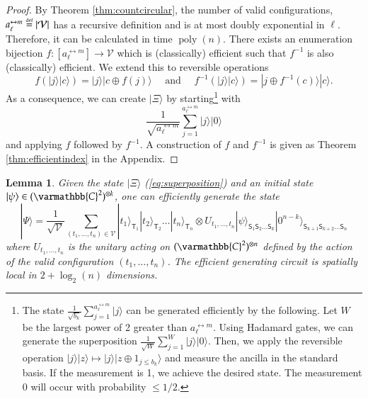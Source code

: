 \documentclass[11pt,letterpaper]{article}
\newtheorem{lemma}[theorem]{Lemma}
\theoremstyle{definition}
\theoremstyle{remark}
\let\mathbb\varmathbb
\newcommand{\abs}[1]{\lvert#1\rvert}
\newcommand{\defeq}{\stackrel{\mbox{\normalfont\tiny def}}=}
\DeclareMathOperator{\poly}{poly}
\newcommand{\cV}{\mathcal V}
\renewcommand{\leq}{\leqslant}
\numberwithin{equation}{section}
\theoremstyle{definition}
\newcommand{\ket}[1]{|#1\rangle}
\newcommand{\sS}{{\mathsf{S}}}
\newcommand{\sT}{{\mathsf{T}}}
\begin{document}
\newcommand{\enum}{f}

\begin{proof}
By Theorem \ref{thm:countcircular}, the number of valid configurations, $a_\ell^{\leftrightarrow m} \defeq \abs{\cV}$ has a recursive definition and is at most doubly exponential in $\ell$. Therefore, it can be calculated in time $\poly(n)$. There exists an enumeration bijection $\enum : [a_\ell^{\leftrightarrow m}] \rightarrow \mathcal{V}$ which is (classically) efficient such that $\enum^{-1}$ is also (classically) efficient. We extend this to reversible operations 
\begin{equation}
\enum(\ket{j}\ket{c}) = \ket{j}\ket{c \oplus \enum(j)} \quad \text{ and } \quad \enum^{-1}(\ket{j}\ket{c}) = \ket{j \oplus \enum^{-1}(c)} \ket{c}.
\end{equation}
As a consequence, we can create $\ket{\Xi}$ by starting\footnote{The state $\frac{1}{\sqrt{b_k}} \sum_{j = 1}^{a_\ell^{\leftrightarrow m}} \ket{j}$ can be generated efficiently by the following. Let $W$ be the largest power of 2 greater than $a_\ell^{\leftrightarrow m}$. Using Hadamard gates, we can generate the superposition $\frac{1}{\sqrt{W}} \sum_{j = 1}^{W} \ket{j}\ket{0}$. Then, we apply the reversible operation $\ket{j}\ket{z} \mapsto \ket{j}\ket{z \oplus 1_{j \leq b_k}}$ and measure the ancilla in the standard basis. If the measurement is 1, we achieve the desired state. The measurement 0  will occur with probability $\leq 1/2$.} with 
\begin{equation}
\frac{1}{\sqrt{a_\ell^{\leftrightarrow m}}} \sum_{j = 1}^{a_\ell^{\leftrightarrow m}} \ket{j} \ket{0}
\end{equation}
and applying $\enum$ followed by $\enum^{-1}$. A construction of $\enum$ and $\enum^{-1}$ is given as Theorem \ref{thm:efficientindex} in the Appendix.

\end{proof}

\begin{lemma}
Given the state $\ket{\Xi}$ (\ref{eq:superposition}) and an initial state $\ket{\psi} \in (\mathbb{C}^2)^{\otimes k}$, one can efficiently generate the state
\begin{equation}
\ket{\Psi} = \frac{1}{\sqrt{\cV}} \sum_{(t_1, \ldots, t_n) \in \cV} \ket{t_1}_{\sT_1} \ket{t_2}_{\sT_2} \ldots \ket{t_n}_{\sT_n} \otimes U_{t_1,\ldots,t_n} \ket{\psi}_{\sS_1 \sS_2 \ldots \sS_k} \ket{0^{n-k}}_{\sS_{k+1} \sS_{k+2} \ldots \sS_n}
\label{eq:gstate}
\end{equation}
where $U_{t_1, \ldots, t_n}$ is the unitary acting on $(\mathbb{C}^2)^{\otimes n}$ defined by the action of the valid configuration $(t_1, \ldots, t_n)$. The efficient generating circuit is spatially local in $2 + \log_2(n)$ dimensions.
\label{lem:buildpsi}
\end{lemma}
\end{document}
